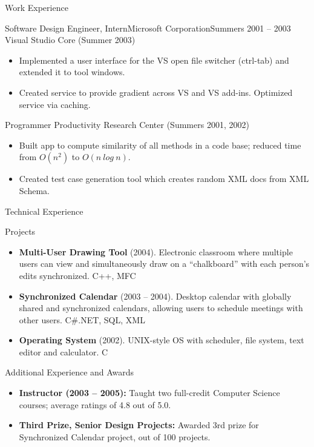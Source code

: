 \documentclass[]{mcdowellcv}
\begin{document}
\begin{cvsection}{Work Experience}
		\begin{cvsubsection}{Software Design Engineer, Intern}{Microsoft Corporation}{Summers 2001 -- 2003}
			Visual Studio Core (Summer 2003)		
			\begin{itemize}
				\item Implemented a user interface for the VS open file switcher (ctrl-tab) and extended it to tool windows.
				\item Created service to provide gradient across VS and VS add-ins. Optimized service via caching.
			\end{itemize}
			Programmer Productivity Research Center (Summers 2001, 2002)
			\begin{itemize}
				\item Built app to compute similarity of all methods in a code base; reduced time from $O(n^2)$ to $O(n\ log\ n)$. 
				\item Created test case generation tool which creates random XML docs from XML Schema.
			\end{itemize}
		\end{cvsubsection}
	\end{cvsection}
	
	
	\begin{cvsection}{Technical Experience}
		\begin{cvsubsection}{Projects}{}{}
			\begin{itemize}
				\item \textbf{Multi-User Drawing Tool} (2004). Electronic classroom where multiple users can view and simultaneously draw on a “chalkboard” with each person’s edits synchronized.  C++, MFC
				\item \textbf{Synchronized Calendar} (2003 – 2004). Desktop calendar with globally shared and synchronized calendars, allowing users to schedule meetings with other users.  C\#.NET, SQL, XML
				\item \textbf{Operating System} (2002).  UNIX-style OS with scheduler, file system, text editor and calculator. C
			\end{itemize}
		\end{cvsubsection}
	\end{cvsection}
	
	\begin{cvsection}{Additional Experience and Awards}
		\begin{cvsubsection}{}{}{}	
			\begin{itemize}
				\item \textbf{Instructor (2003 – 2005):} Taught two full-credit Computer Science courses; average ratings of 4.8 out of 5.0.
				\item \textbf{Third Prize, Senior Design Projects:} Awarded 3rd prize for Synchronized Calendar project, out of 100 projects.
			\end{itemize}
		\end{cvsubsection}
	\end{cvsection}
	
\end{document}
